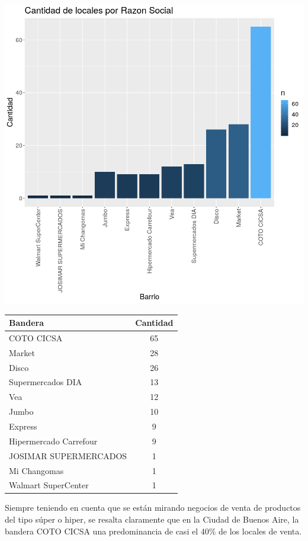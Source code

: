 \begin{center}
    \includegraphics[scale=0.6]{img/cantLocales_vs_bandera.png}
\end{center}


\begin{center}
 \begin{tabular}{||l c||} 
 \hline
 Bandera & Cantidad \\ [0.5ex] 
 \hline\hline
 COTO CICSA & 65 \\ 
 \hline
 Market & 28 \\
 \hline
 Disco & 26 \\
 \hline
 Supermercados DIA & 13 \\
 \hline
 Vea & 12 \\
 \hline
 Jumbo & 10 \\
 \hline
 Express & 9 \\
 \hline
 Hipermercado Carrefour & 9 \\
 \hline
 JOSIMAR SUPERMERCADOS & 1 \\
 \hline
 Mi Changomas & 1 \\
 \hline
 Walmart SuperCenter & 1 \\[1ex]
 \hline
 \hline
\end{tabular}
\end{center}


Siempre teniendo en cuenta que se están mirando negocios de venta de productos del tipo súper o hiper, se resalta claramente que en la Ciudad de Buenos Aire, la bandera COTO CICSA una predominancia de casi el 40\% de los locales de venta.\\

